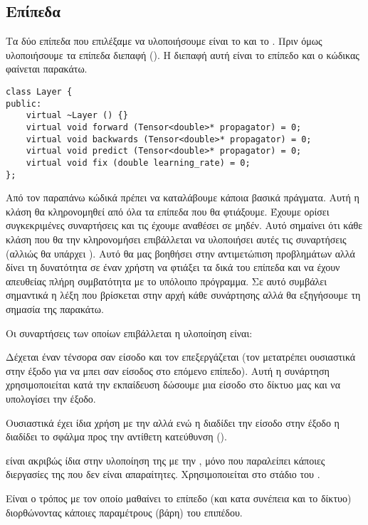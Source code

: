\subsection{Επίπεδα}
Τα δύο επίπεδα που επιλέξαμε να υλοποιήσουμε είναι το  και το . Πριν όμως υλοποιήσουμε τα επίπεδα διεπαφή (). Η διεπαφή αυτή είναι το επίπεδο και ο κώδικας φαίνεται
παρακάτω.
\begin{otherlanguage}{english}
\begin{lstlisting}[style=cppstyle,caption=Layer Interface, xleftmargin=-0.35cm, xrightmargin=-0.35cm]
class Layer {
public:
    virtual ~Layer () {}
    virtual void forward (Tensor<double>* propagator) = 0;
    virtual void backwards (Tensor<double>* propagator) = 0;
    virtual void predict (Tensor<double>* propagator) = 0;
    virtual void fix (double learning_rate) = 0;
};
\end{lstlisting}
\end{otherlanguage}
Από τον παραπάνω κώδικά πρέπει να καταλάβουμε κάποια βασικά πράγματα. Αυτή η κλάση θα κληρονομηθεί από όλα τα επίπεδα που θα φτιάξουμε. Έχουμε ορίσει συγκεκριμένες συναρτήσεις και τις έχουμε αναθέσει σε μηδέν. Αυτό σημαίνει ότι κάθε κλάση
που θα την κληρονομήσει επιβάλλεται να υλοποιήσει αυτές τις συναρτήσεις (αλλιώς θα υπάρχει ). Αυτό θα μας βοηθήσει στην αντιμετώπιση προβλημάτων αλλά δίνει τη δυνατότητα σε έναν χρήστη να φτιάξει τα δικά του επίπεδα και να έχουν
απευθείας πλήρη συμβατότητα με το υπόλοιπο πρόγραμμα. Σε αυτό συμβάλει σημαντικά η λέξη  που βρίσκεται στην αρχή κάθε συνάρτησης αλλά θα εξηγήσουμε τη σημασία της παρακάτω.

Οι συναρτήσεις των οποίων επιβάλλεται η υλοποίηση είναι:
\begin{description}
    \sloppy
    \item[\en{forward}] Δέχεται έναν τένσορα σαν  είσοδο και τον επεξεργάζεται (τον μετατρέπει ουσιαστικά στην έξοδο για να μπει σαν είσοδος στο επόμενο επίπεδο). Αυτή η συνάρτηση χρησιμοποιείται κατά την εκπαίδευση δώσουμε μια είσοδο στο
    δίκτυο μας και να υπολογίσει την έξοδο.
    \item[\en{backwords}] Ουσιαστικά έχει ίδια χρήση με την  αλλά ενώ η  διαδίδει την είσοδο στην έξοδο η  διαδίδει το σφάλμα προς την αντίθετη κατεύθυνση ().
    \item[\en{predict}] είναι ακριβώς ίδια στην υλοποίηση της με την , μόνο που παραλείπει κάποιες διεργασίες της που δεν είναι απαραίτητες. Χρησιμοποιείται στο στάδιο του .
    \item[\en{fix}] Είναι ο τρόπος με τον οποίο μαθαίνει το επίπεδο (και κατα συνέπεια και το δίκτυο) διορθώνοντας κάποιες παραμέτρους (βάρη) του επιπέδου.
\end{description}

